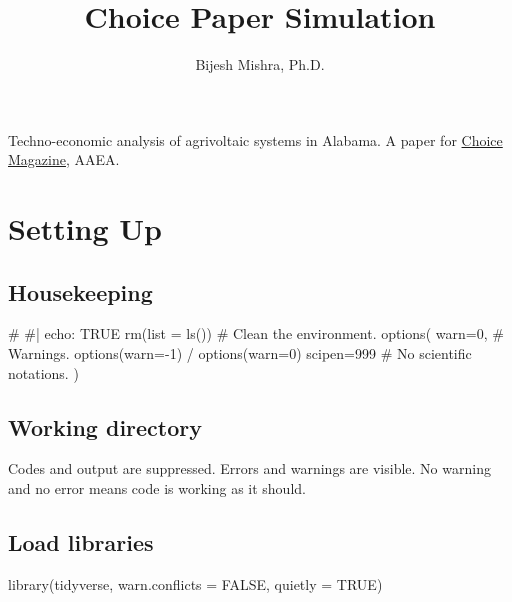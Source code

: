 \documentclass[
  letterpaper,
  DIV=11,
  numbers=noendperiod]{scrartcl}
\title{Choice Paper Simulation}
\author{Bijesh Mishra, Ph.D.}
\date{}
\newenvironment{Shaded}{\begin{snugshade}}{\end{snugshade}}
\newcommand{\AttributeTok}[1]{\textcolor[rgb]{0.40,0.45,0.13}{#1}}
\newcommand{\CommentTok}[1]{\textcolor[rgb]{0.37,0.37,0.37}{#1}}
\newcommand{\ConstantTok}[1]{\textcolor[rgb]{0.56,0.35,0.01}{#1}}
\newcommand{\DecValTok}[1]{\textcolor[rgb]{0.68,0.00,0.00}{#1}}
\newcommand{\FunctionTok}[1]{\textcolor[rgb]{0.28,0.35,0.67}{#1}}
\newcommand{\NormalTok}[1]{\textcolor[rgb]{0.00,0.23,0.31}{#1}}
\renewcommand*\contentsname{Table of contents}
\newcommand\contentsname{Table of contents}
\begin{document}
\maketitle

\renewcommand*\contentsname{Table of contents}
{
\hypersetup{linkcolor=}
\setcounter{tocdepth}{3}
\tableofcontents
}
\newpage

Techno-economic analysis of agrivoltaic systems in Alabama. A paper for
\href{https://www.aaea.org/publications/choices-magazine}{Choice
Magazine}, AAEA.

\section{Setting Up}\label{setting-up}

\subsection{Housekeeping}\label{housekeeping}

\begin{Shaded}
\begin{Highlighting}[]
\CommentTok{\# \#| echo: TRUE}
\FunctionTok{rm}\NormalTok{(}\AttributeTok{list =} \FunctionTok{ls}\NormalTok{()) }\CommentTok{\# Clean the environment.}
\FunctionTok{options}\NormalTok{(}
  \AttributeTok{warn=}\DecValTok{0}\NormalTok{, }\CommentTok{\# Warnings. options(warn={-}1) / options(warn=0)}
  \AttributeTok{scipen=}\DecValTok{999} \CommentTok{\# No scientific notations.}
\NormalTok{  )}
\end{Highlighting}
\end{Shaded}

\subsection{Working directory}\label{working-directory}

Codes and output are suppressed. Errors and warnings are visible. No
warning and no error means code is working as it should.

\subsection{Load libraries}\label{load-libraries}

\begin{Shaded}
\begin{Highlighting}[]
\FunctionTok{library}\NormalTok{(tidyverse, }\AttributeTok{warn.conflicts =} \ConstantTok{FALSE}\NormalTok{, }\AttributeTok{quietly =} \ConstantTok{TRUE}\NormalTok{)}
\end{Highlighting}
\end{Shaded}
\end{document}
